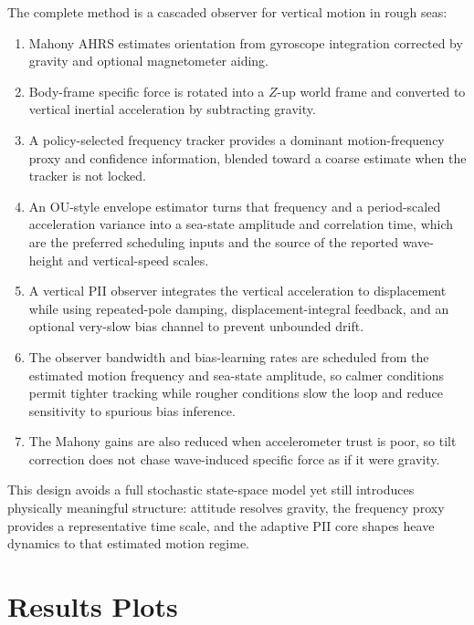 \documentclass[conference]{IEEEtran}
\begin{document}
    The complete method is a cascaded observer for vertical motion in rough seas:
    \begin{enumerate}[leftmargin=1.5em]
        \item Mahony AHRS estimates orientation from gyroscope integration corrected by
        gravity and optional magnetometer aiding.
        \item Body-frame specific force is rotated into a \(Z\)-up world frame and
        converted to vertical inertial acceleration by subtracting gravity.
        \item A policy-selected frequency tracker provides a dominant motion-frequency
        proxy and confidence information, blended toward a coarse estimate when
        the tracker is not locked.
        \item An OU-style envelope estimator turns that frequency and a
        period-scaled acceleration variance into a sea-state amplitude and
        correlation time, which are the preferred scheduling inputs and the
        source of the reported wave-height and vertical-speed scales.
        \item A vertical PII observer integrates the vertical acceleration to
        displacement while using repeated-pole damping, displacement-integral
        feedback, and an optional very-slow bias channel to prevent unbounded
        drift.
        \item The observer bandwidth and bias-learning rates are scheduled from the
        estimated motion frequency and sea-state amplitude, so calmer conditions
        permit tighter tracking while rougher conditions slow the loop and reduce
        sensitivity to spurious bias inference.
        \item The Mahony gains are also reduced when accelerometer trust is poor, so
        tilt correction does not chase wave-induced specific force as if it were
        gravity.
    \end{enumerate}

    This design avoids a full stochastic state-space model yet still introduces
    physically meaningful structure: attitude resolves gravity, the frequency
    proxy provides a representative time scale, and the adaptive PII core shapes
    heave dynamics to that estimated motion regime.

    \section{Results Plots}
\end{document}
